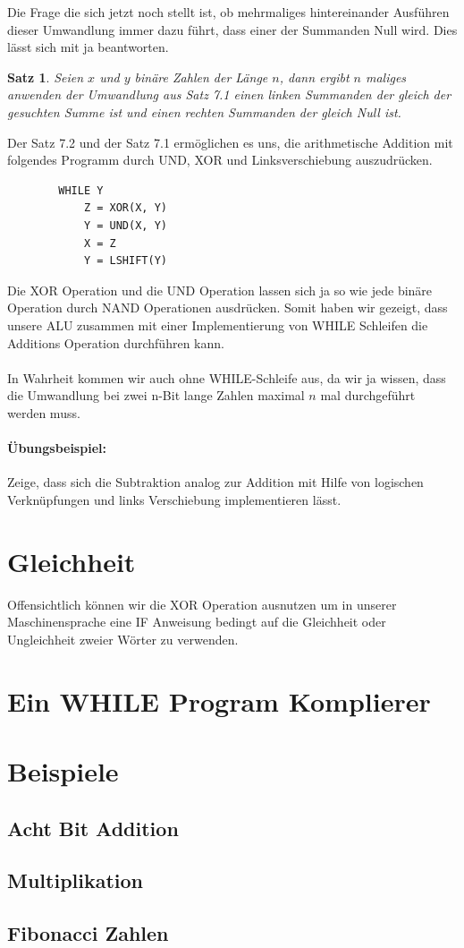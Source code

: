 \documentclass[11pt,a4paper,leqno]{report}
\newtheorem{proposition}{Satz}[chapter]
\numberwithin{equation}{chapter}
\begin{document}
\noindent
Die Frage die sich jetzt noch stellt ist, ob mehrmaliges hintereinander Ausf\"uhren dieser Umwandlung immer dazu f\"uhrt, dass einer der Summanden Null wird. Dies l\"asst sich mit ja beantworten.
\begin{proposition}
	Seien $x$ und $y$ bin\"are Zahlen der L\"ange $n$, dann ergibt $n$ maliges anwenden der Umwandlung aus Satz 7.1 einen linken Summanden der gleich der gesuchten Summe ist und einen rechten Summanden der gleich Null ist.
\end{proposition}
\noindent
Der Satz 7.2 und der Satz 7.1 erm\"oglichen es uns, die arithmetische Addition mit folgendes Programm durch UND, XOR und Linksverschiebung auszudr\"ucken.
\begin{lstlisting}
		WHILE Y
			Z = XOR(X, Y)
			Y = UND(X, Y)
			X = Z
			Y = LSHIFT(Y)
\end{lstlisting}
Die XOR Operation und die UND Operation lassen sich ja so wie jede bin\"are Operation durch NAND Operationen ausdr\"ucken. Somit haben wir gezeigt, dass unsere ALU zusammen mit einer Implementierung von WHILE Schleifen die Additions Operation durchf\"uhren kann.\\
\\
In Wahrheit kommen wir auch ohne WHILE-Schleife aus, da wir ja wissen, dass die Umwandlung bei zwei n-Bit lange Zahlen maximal $n$ mal durchgef\"uhrt werden muss.
\paragraph{\"Ubungsbeispiel:} Zeige, dass sich die Subtraktion analog zur Addition mit Hilfe von logischen Verkn\"upfungen und links Verschiebung implementieren l\"asst.
\section{Gleichheit}
Offensichtlich k\"onnen wir die XOR Operation ausnutzen um in unserer Maschinensprache eine IF Anweisung bedingt auf die Gleichheit oder Ungleichheit zweier W\"orter zu verwenden.
\section{Ein WHILE Program Komplierer}
\section{Beispiele}
\subsection{Acht Bit Addition}
\subsection{Multiplikation}
\subsection{Fibonacci Zahlen}
\end{document}
